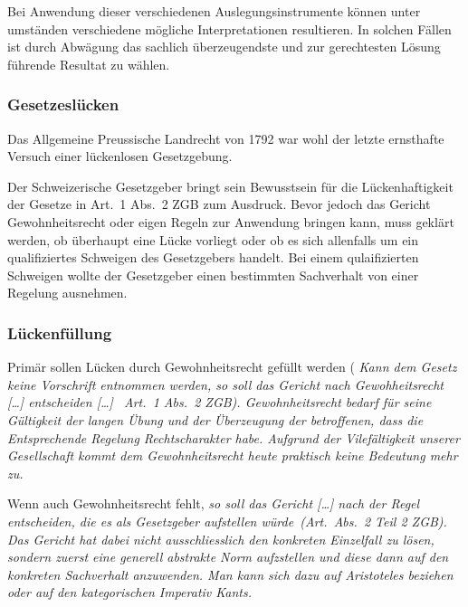 Bei Anwendung dieser verschiedenen Auslegungsinstrumente können unter
umständen verschiedene mögliche Interpretationen resultieren. In solchen
Fällen ist durch Abwägung das sachlich überzeugendste und zur
gerechtesten Lösung führende Resultat zu wählen\autocite[\S\ 4 N.\
59]{riemer_einleitungsartikel}.

\subsubsection{Gesetzeslücken}
Das Allgemeine Preussische Landrecht von 1792 war wohl der letzte
ernsthafte Versuch einer lückenlosen Gesetzgebung\autocite[Seite
332]{wieacker}.

Der Schweizerische Gesetzgeber bringt sein Bewusstsein für die
Lücken\-haftigkeit der Gesetze in Art.\ 1 Abs.\ 2 ZGB zum Ausdruck. Bevor
jedoch das Gericht Gewohnheitsrecht oder eigen Regeln zur Anwendung
bringen kann, muss geklärt werden, ob überhaupt eine Lücke vorliegt oder
ob es sich allenfalls um ein qualifiziertes Schweigen des Gesetzgebers
handelt. Bei einem qulaifizierten Schweigen wollte der Gesetzgeber einen
bestimmten Sachverhalt von einer Regelung ausnehmen\autocite[\S\ 4 N.\
88]{riemer_einleitungsartikel}.

\subsubsection{Lückenfüllung}
Primär sollen Lücken durch Gewohnheitsrecht gefüllt werden (\itshape
\flqq Kann dem Gesetz keine Vorschrift entnommen werden, so soll das
Gericht nach Gewohheitsrecht [\ldots] entscheiden [\ldots]\frqq
\normalfont\ Art.\ 1 Abs.\ 2 ZGB). Gewohnheitsrecht bedarf für seine
Gültigkeit der langen Übung und der Überzeugung der betroffenen, dass
die Entsprechende Regelung Rechtscharakter habe\autocite[N.\
418]{bk_zgb1}. Aufgrund der Vilefältigkeit unserer Gesellschaft kommt
dem Gewohnheitsrecht heute praktisch keine Bedeutung mehr
zu\autocites[N.\ 431]{bk_zgb1}[\S\ 4 N.\
125]{riemer_einleitungsartikel}[Seite 40]{tuor_schnyder}.

Wenn auch Gewohnheitsrecht fehlt, \itshape so soll das Gericht [\ldots]
nach der Regel entscheiden, die es als Gesetzgeber aufstellen
würde\normalfont\ (Art.\ Abs.\ 2 Teil 2 ZGB). Das Gericht hat dabei
nicht ausschliesslich den konkreten Einzelfall zu lösen, sondern zuerst
eine generell abstrakte Norm aufzstellen und diese dann auf den
konkreten Sachverhalt anzuwenden\autocite[\S\ 4 N.\
130]{riemer_einleitungsartikel}. Man kann sich dazu auf Aristoteles
beziehen\autocite[Seite 42]{tuor_schnyder} oder auf den kategorischen
Imperativ Kants\autocite[Seite 421, Zeilen 7 -- 8]{gms}.


